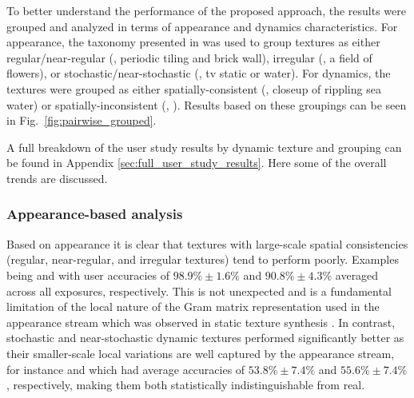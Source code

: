 To better understand the performance of the proposed approach,
the results were grouped and analyzed in terms of
appearance and dynamics characteristics.
For appearance, the taxonomy
presented in \cite{lin2006quantitative} was used to group textures as
either regular/near-regular (\eg, periodic tiling and brick wall), 
irregular (\eg, a field of flowers), or
stochastic/near-stochastic (\eg, tv static or water).
For dynamics, the textures were grouped as either 
spatially-consistent (\eg, closeup of rippling sea water) or 
spatially-inconsistent (\eg, ). 
Results based on these groupings can be seen in
Fig.\ \ref{fig:pairwise_grouped}.



A full breakdown of the user study results by dynamic texture and 
grouping can be found in Appendix \ref{sec:full_user_study_results}.
Here some of the overall trends are discussed.

\subsubsection{Appearance-based analysis}

Based on appearance it is clear that textures with
large-scale spatial consistencies (regular, near-regular, 
and irregular textures) tend to perform poorly.
Examples being  and  with
user accuracies of $98.9\% \pm 1.6\%$ and $90.8\% \pm 4.3\%$ 
averaged across all exposures, respectively.
This  is not unexpected and is a fundamental limitation of the 
local nature of the Gram matrix representation used in the 
appearance stream which was observed in static texture synthesis 
\cite{gatys2015}.
In contrast, stochastic and near-stochastic dynamic textures 
performed significantly better as their smaller-scale local 
variations are well captured by the appearance stream, for 
instance  and  which had 
average accuracies of $53.8\% \pm 7.4\%$ and
$55.6\% \pm 7.4\%$, respectively, making them both 
statistically indistinguishable from real.

